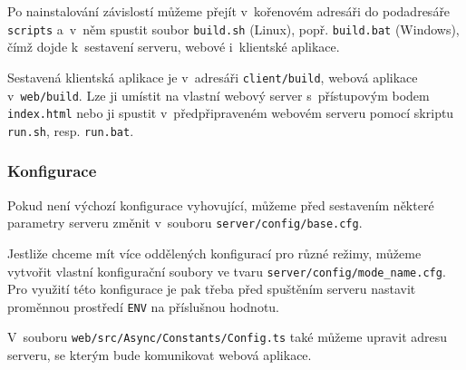 \documentclass[a4paper,12pt]{article}
\def\code#1{\texttt{#1}}
\begin{document}
{{{{{{{{{{Po nainstalování závislostí můžeme přejít v~kořenovém adresáři do podadresáře \code{scripts} a~v~něm spustit soubor \code{build.sh} (Linux), popř. \code{build.bat} (Windows), čímž dojde k~sestavení serveru, webové i~klientské aplikace.



Sestavená klientská aplikace je v~adresáři \code{client/build}, webová aplikace v~\code{web/build}. Lze ji umístit na  vlastní webový server s~přístupovým bodem \code{index.html} nebo ji spustit v~předpřipraveném webovém serveru pomocí skriptu \code{run.sh}, resp. \code{run.bat}.

{

\subsubsection{Konfigurace}

Pokud není výchozí konfigurace vyhovující, můžeme před sestavením některé parametry serveru změnit v~souboru \code{server/config/base.cfg}.



\vspace{-10pt}

Jestliže chceme mít více oddělených konfigurací pro různé režimy, můžeme vytvořit vlastní konfigurační soubory ve tvaru \code{server/config/mode\_name.cfg}. Pro využití této konfigurace je pak třeba před spuštěním serveru nastavit proměnnou prostředí \code{ENV} na příslušnou hodnotu.



V~souboru \code{web/src/Async/Constants/Config.ts} také můžeme upravit adresu serveru, se kterým bude komunikovat webová aplikace.

}}}}}}}}}}}
\end{document}
